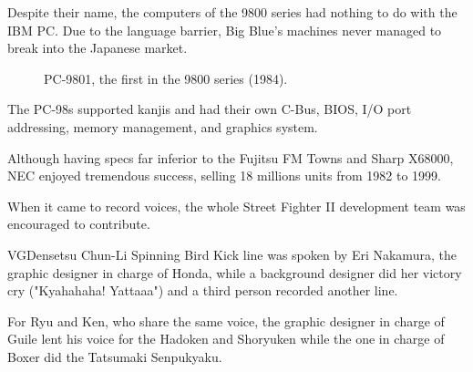 Despite their name, the computers of the 9800 series had nothing to do with the IBM PC. Due to the language barrier, Big Blue's machines never managed to break into the Japanese market.

\begin{figure}[H]
\caption*{PC-9801, the first in the 9800 series (1984).}
\end{figure}

The PC-98s supported kanjis and had their own C-Bus, BIOS, I/O port addressing, memory management, and graphics system. 

Although having specs far inferior to the Fujitsu FM Towns and Sharp X68000, NEC enjoyed tremendous success, selling 18 millions units from 1982 to 1999.







When it came to record voices, the whole Street Fighter II development team was encouraged to contribute.

\begin{q}{VGDensetsu\cite{sf2samples}  }
Chun-Li Spinning Bird Kick line was spoken by Eri Nakamura, the graphic designer in charge of Honda, while a background designer did her victory cry ("Kyahahaha! Yattaaa") and a third person recorded another line.

For Ryu and Ken, who share the same voice, the graphic designer in charge of Guile lent his voice for the Hadoken and Shoryuken while the one in charge of Boxer did the Tatsumaki Senpukyaku.  
\end{q}




